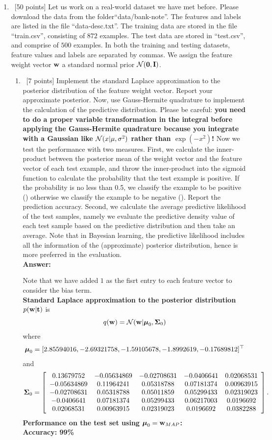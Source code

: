 \documentclass[12pt, fullpage,letterpaper]{article}
\def\red{\color{black!30!red}}
\def\blackblue{\color{black!40!blue}}
\begin{document}
\begin{enumerate}
	\item~[50 points] Let us work on a real-world dataset we have met before. Please download the data from the folder``data/bank-note''. The features and labels are listed in the file ``data-desc.txt''. The training data are stored in the file ``train.csv'', consisting of $872$ examples. The test data are stored in ``test.csv'', and comprise of $500$ examples. In both the training and testing datasets, feature values and labels are separated by commas. We assign the feature weight vector ${\bf w}$ a standard normal prior $\mathcal{N}({\bf 0}, {\bf I})$.  
	\begin{enumerate}
		\item~[7 points] Implement the standard Laplace approximation to the posterior distribution of the feature weight vector. Report your approximate posterior. Now, use Gauss-Hermite quadrature to implement the calculation of the predictive distribution. Please be careful: \textbf{you need to do a proper variable transformation in the integral before applying the Gauss-Hermite quadrature because you integrate  with a Gaussian like $\mathcal{N}(x|\mu, \sigma^2)$ rather than $\exp(-x^2)$!} Now we test the performance with two measures. First, we calculate the inner-product between the posterior mean of the weight vector and the feature vector of each test example, and throw the inner-product into the sigmoid function to calculate the probability that the test example is positive. If the probability is no less than 0.5, we classify the example to be positive () otherwise we classify the example to be negative (). Report the prediction accuracy. Second, we calculate the average predictive likelihood of the test samples, namely we evaluate the predictive density value of each test sample based on the predictive distribution and then take an average.  Note that in Bayesian learning, the predictive likelihood includes all the information of the (approximate) posterior distribution, hence is more preferred in the evaluation. \\
{\bf \red Answer: }{\blackblue 
{\red Note that we have added $1$ as the fisrt entry to each feature vector to consider the bias term. }\\
{\bf Standard Laplace approximation to the posterior distribution $p({\bf w}|{\bf t})$} is  
$$q({\bf w}) = \mathcal{N}({\bf w}|\boldsymbol{\mu}_0,\boldsymbol{\Sigma}_0)$$
where 
$$\boldsymbol{\mu}_0 = [ 2.85594016, -2.69321758, -1.59105678, -1.8992619 , -0.17689812]^\top$$
and
$$\boldsymbol{\Sigma}_0 = \left[\begin{array}{ccccc}
0.13679752 & -0.05634869 & -0.02708631 & -0.0406641 &  0.02068531\\
-0.05634869 &  0.11964241 &  0.05318788 &  0.07181374 &  0.00963915\\
-0.02708631 &  0.05318788 & 0.05011859 &  0.05299433 &  0.02319023\\
-0.0406641 &  0.07181374 &  0.05299433 &  0.06217003 &  0.0196692\\
0.02068531 &  0.00963915 &  0.02319023 &  0.0196692  &  0.0382288
\end{array}\right].$$
{\bf Performance on the test set using $\boldsymbol{\mu}_0 = {\bf w}_{MAP}$:}\\
{\bf Accuracy: 99\%}

}
\end{enumerate}
\end{enumerate}
\end{document}
